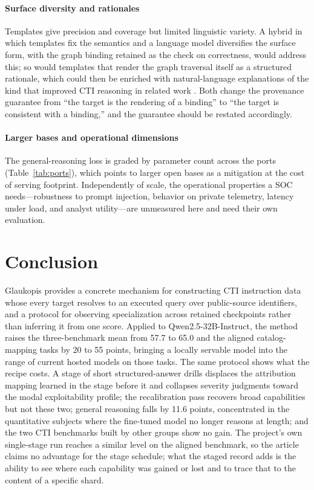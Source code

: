 \documentclass[twocolumn]{svjour3}
\begin{document}
\paragraph{Surface diversity and rationales}
Templates give precision and coverage but limited linguistic variety. A hybrid in which templates fix the semantics and a language model diversifies the surface form, with the graph binding retained as the check on correctness, would address this; so would templates that render the graph traversal itself as a structured rationale, which could then be enriched with natural-language explanations of the kind that improved CTI reasoning in related work \cite{levi2025toward}. Both change the provenance guarantee from ``the target is the rendering of a binding'' to ``the target is consistent with a binding,'' and the guarantee should be restated accordingly.

\paragraph{Larger bases and operational dimensions}
The general-reasoning loss is graded by parameter count across the ports (Table~\ref{tab:ports}), which points to larger open bases as a mitigation at the cost of serving footprint. Independently of scale, the operational properties a SOC needs---robustness to prompt injection, behavior on private telemetry, latency under load, and analyst utility---are unmeasured here and need their own evaluation.

\section{Conclusion}\label{sec:conclusion}
Glaukopis provides a concrete mechanism for constructing CTI instruction data whose every target resolves to an executed query over public-source identifiers, and a protocol for observing specialization across retained checkpoints rather than inferring it from one score. Applied to Qwen2.5-32B-Instruct, the method raises the three-benchmark mean from 57.7 to 65.0 and the aligned catalog-mapping tasks by 20 to 55 points, bringing a locally servable model into the range of current hosted models on those tasks. The same protocol shows what the recipe costs. A stage of short structured-answer drills displaces the attribution mapping learned in the stage before it and collapses severity judgments toward the modal exploitability profile; the recalibration pass recovers broad capabilities but not these two; general reasoning falls by 11.6 points, concentrated in the quantitative subjects where the fine-tuned model no longer reasons at length; and the two CTI benchmarks built by other groups show no gain. The project's own single-stage run reaches a similar level on the aligned benchmark, so the article claims no advantage for the stage schedule; what the staged record adds is the ability to see where each capability was gained or lost and to trace that to the content of a specific shard.
\end{document}
